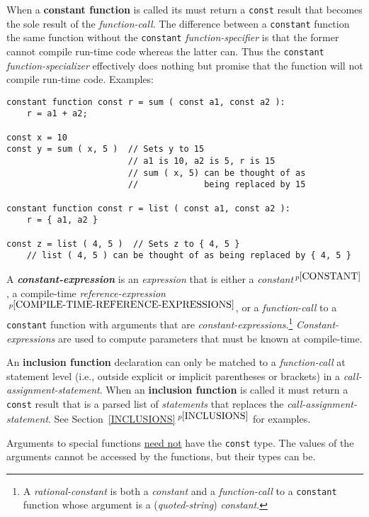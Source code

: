 \documentclass[12pt]{article}
\newcommand{\key}[1]{{\rm \bfseries #1}}
\newcommand{\emkey}[1]{{\em \bfseries #1}}
\newcommand{\itemref}[1]{\ref{#1}$\,^{p\pageref{#1}}$}
\newcommand{\pagnote}[1]{$\,^{p\pageref{#1}}$}
\newenvironment{indpar}[1][0.3in]%
	{\begin{list}{}%
		     {\setlength{\itemsep}{0in}%
		      \setlength{\topsep}{0in}%
		      \setlength{\parsep}{1ex}%
		      \setlength{\labelwidth}{#1}%
		      \setlength{\leftmargin}{#1}%
		      \addtolength{\leftmargin}{\labelsep}}%
	 \item}%
	{\end{list}}
\begin{document}
When a \key{constant function}\label{CONSTANT-FUNCTION} is called
its must return a {\tt const} result that becomes the sole
result of the {\em function-call}.  The difference between a
{\tt constant} function the same function without the {\tt constant}
{\em function-specifier} is that the former cannot compile run-time code
whereas the latter can.
Thus the {\tt constant} {\em function-specializer} effectively does nothing
but promise that the function will not compile run-time code.
Examples:
\begin{indpar}\begin{verbatim}
constant function const r = sum ( const a1, const a2 ):
    r = a1 + a2;

const x = 10
const y = sum ( x, 5 )  // Sets y to 15
                        // a1 is 10, a2 is 5, r is 15
                        // sum ( x, 5) can be thought of as
                        //             being replaced by 15

constant function const r = list ( const a1, const a2 ):
    r = { a1, a2 }

const z = list ( 4, 5 )  // Sets z to { 4, 5 }
    // list ( 4, 5 ) can be thought of as being replaced by { 4, 5 }
\end{verbatim}\end{indpar}


A \emkey{constant-expression}\label{CONSTANT-EXPRESSION}
is an {\em expression} that is either
a {\em constant}\pagnote{CONSTANT}, a compile-time
{\em refer\-ence-expression}\pagnote{COMPILE-TIME-REFERENCE-EXPRESSIONS},
or a {\em function-call} to a {\tt constant} function
with arguments that are {\em con\-stant-expressions}.\footnote{
A {\em rational-constant} is both a {\em constant} and a {\em function-call}
to a {\tt constant} function whose argument is a ({\em quoted-string})
{\em constant}.}
{\em Constant-expressions} are used to compute parameters that must be
known at compile-time.

An \key{inclusion function} declaration can only be matched to
a {\em function-call} at statement level (i.e., outside explicit or implicit
parentheses or brackets) in a {\em call-assign\-ment-statement}.
When an \key{inclusion function} is called it must return a {\tt const} result
that is a parsed list of {\em statements} that replaces
the {\em call-assignment-statement}.
See Section~\itemref{INCLUSIONS} for examples.

Arguments to special functions \underline{need not} have the {\tt const}
type.  The values of the arguments cannot be accessed by the functions,
but their types can be.
\end{document}
